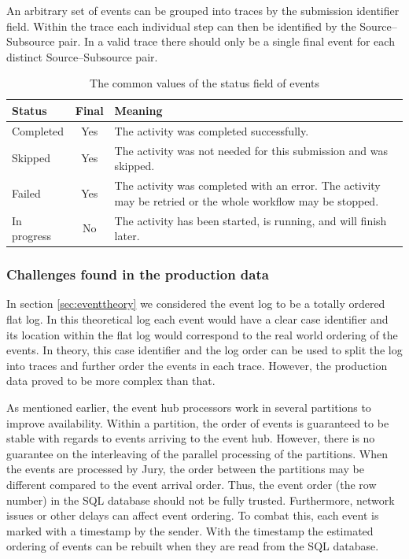 An arbitrary set of events can be grouped into traces by the submission identifier field. 
Within the trace each individual step can then be identified by the Source--Subsource pair.
In a valid trace there should only be a single final event for each distinct Source--Subsource pair.

\begin{table}[htb]
\begin{center}
\begin{tabularx}{\linewidth}{| l | c | X | }
\hline
\textbf{Status} & \textbf{Final} & \textbf{Meaning} \\
\hline
Completed   & Yes & The activity was completed successfully. \\
\hline
Skipped     & Yes & The activity was not needed for this submission and was skipped. \\
\hline
Failed      & Yes & The activity was completed with an error. The activity may be retried or the whole workflow may be stopped. \\
\hline
In progress & No  & The activity has been started, is running, and will finish later. \\
\hline
\end{tabularx}
\end{center}
\caption{The common values of the status field of events}
\label{tab:statuses}
\end{table}

\subsubsection{Challenges found in the production data}
\label{sec:datachallenges}

In section \ref{sec:eventtheory} we considered the event log to be a totally ordered flat log. 
In this theoretical log each event would have a clear case identifier and its location within the flat log would correspond to the real world ordering of the events.
In theory, this case identifier and the log order can be used to split the log into traces and further order the events in each trace.
However, the production data proved to be more complex than that. 

As mentioned earlier, the event hub processors work in several partitions to improve availability.
Within a partition, the order of events is guaranteed to be stable with regards to events arriving to the event hub. 
However, there is no guarantee on the interleaving of the parallel processing of the partitions.
When the events are processed by Jury, the order between the partitions may be different compared to the event arrival order. 
Thus, the event order (the row number) in the SQL database should not be fully trusted.
Furthermore, network issues or other delays can affect event ordering. 
To combat this, each event is marked with a timestamp by the sender. 
With the timestamp the estimated ordering of events can be rebuilt when they are read from the SQL database.

